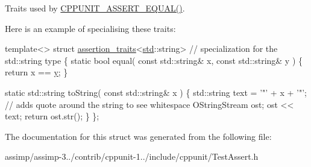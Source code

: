 Traits used by \hyperlink{group___assertions_ga71162f05be07ef6817d156e77c68b1a3}{C\+P\+P\+U\+N\+I\+T\+\_\+\+A\+S\+S\+E\+R\+T\+\_\+\+E\+Q\+U\+A\+L()}. 

Here is an example of specialising these traits\+:


\begin{DoxyCode}
\textcolor{keyword}{template}<>
\textcolor{keyword}{struct }\hyperlink{structassertion__traits}{assertion\_traits}<\hyperlink{namespacestd}{std}::string>   \textcolor{comment}{// specialization for the std::string type}
\{
  \textcolor{keyword}{static} \textcolor{keywordtype}{bool} equal( \textcolor{keyword}{const} std::string& x, \textcolor{keyword}{const} std::string& y )
  \{
    \textcolor{keywordflow}{return} x == \hyperlink{_ice_utils_8h_aa7ffaed69623192258fb8679569ff9ba}{y};
  \}

  \textcolor{keyword}{static} std::string toString( \textcolor{keyword}{const} std::string& x )
  \{
    std::string text = \textcolor{charliteral}{'"'} + x + \textcolor{charliteral}{'"'};    \textcolor{comment}{// adds quote around the string to see whitespace}
    OStringStream ost;
    ost << text;
    \textcolor{keywordflow}{return} ost.str();
  \}
\};
\end{DoxyCode}
 

The documentation for this struct was generated from the following file\+:\begin{DoxyCompactItemize}
\item 
assimp/assimp-\/3../contrib/cppunit-\/1../include/cppunit/Test\+Assert.\+h\end{DoxyCompactItemize}
